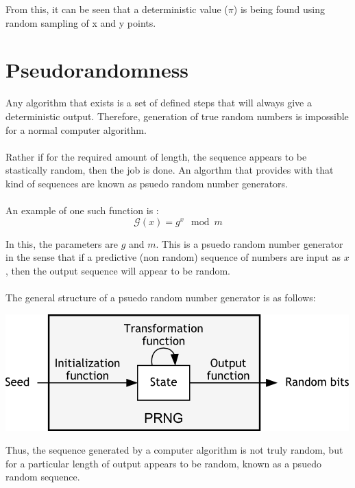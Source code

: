 

\noindent From this, it can be seen that a deterministic value 
($\pi$) is being found using random sampling of x and y points.
\section{Pseudorandomness}
Any algorithm that exists is a set of defined steps that will 
always give a deterministic output. Therefore, generation of 
true random numbers is impossible for a normal computer algorithm.
\\\\
Rather if for the required amount of length, the sequence appears 
to be stastically random, then the job is done. An algorthm that 
provides with that kind of sequences are known as psuedo random 
number generators.
\\\\
An example of one such function is :
\begin{equation*}
    \mathcal{G}(x) = g^x \mod m
\end{equation*}

\noindent In this, the parameters are $g$ and $m$. This 
is a psuedo random number generator in the sense that if 
a predictive (non random) sequence of numbers are input as $x$, 
then the output sequence will appear to be random.
\\\\
The general structure of a psuedo random number generator is 
as follows:

\begin{center}
    \includegraphics[scale = 0.6]{img/prng_gen.png}
\end{center}

\noindent Thus, the sequence generated by a computer 
algorithm is not truly random, but for a particular length 
of output appears to be random, known as a psuedo random 
sequence.
